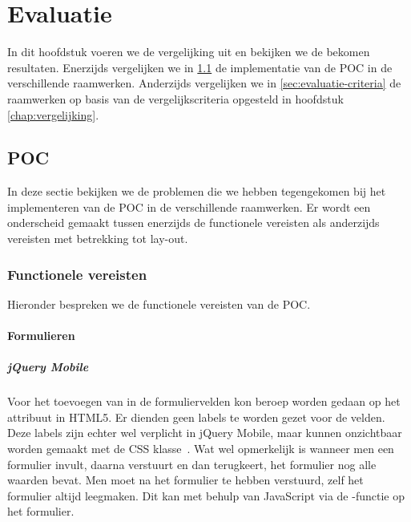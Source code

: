 \chapter{Evaluatie}
\label{chap:evaluatie}

In dit hoofdstuk voeren we de vergelijking uit en bekijken we de bekomen resultaten.
Enerzijds vergelijken we in \ref{sec:evaluatie-poc} de implementatie van de POC in de verschillende raamwerken.
Anderzijds vergelijken we in \ref{sec:evaluatie-criteria} de raamwerken op basis van de vergelijkscriteria opgesteld in hoofdstuk \ref{chap:vergelijking}.


\section{POC}
\label{sec:evaluatie-poc}
In deze sectie bekijken we de problemen die we hebben tegengekomen bij het implementeren van de POC in de verschillende raamwerken.
Er wordt een onderscheid gemaakt tussen enerzijds de functionele vereisten als anderzijds vereisten met betrekking tot lay-out.

\subsection{Functionele vereisten}
Hieronder bespreken we de functionele vereisten van de POC.

\subsubsection{Formulieren}

\paragraph{jQuery Mobile} 
Voor het toevoegen van  in de formuliervelden kon beroep worden gedaan op het  attribuut in HTML5. 
Er dienden geen labels te worden gezet voor de velden. 
Deze labels zijn echter wel verplicht in jQuery Mobile, maar kunnen onzichtbaar worden gemaakt met de  CSS klasse~\cite{JQuery2013}. 
Wat wel opmerkelijk is wanneer men een formulier invult, daarna verstuurt en dan terugkeert, het formulier nog alle waarden bevat. 
Men moet na het formulier te hebben verstuurd, zelf het formulier altijd leegmaken. 
Dit kan met behulp van JavaScript via de -functie op het formulier.


